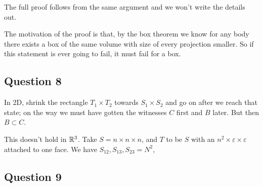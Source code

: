 \documentclass[a4paper]{article}
\begin{document}
The full proof follows from the same argument and we won't write the details out.

The motivation of the proof is that, by the box theorem we know for any body there exists a box of the same volume with size of every projection smaller. So if this statement is ever going to fail, it must fail for a box.

\subsection{Question 8}

In 2D, shrink the rectangle $T_1 \times T_2$ towards $S_1 \times S_2$ and go on after we reach that state; on the way we must have gotten the witnesses $C$ first and $B$ later. But then $B \subset C$.

This doesn't hold in $\mathbb{R}^3$. Take $S=n \times n \times n$, and $T$ to be $S$ with an $n^2 \times \varepsilon \times \varepsilon$ attached to one face. We have $S_{12},S_{13},S_{23} = N^2$,

\subsection{Question 9}
\end{document}
